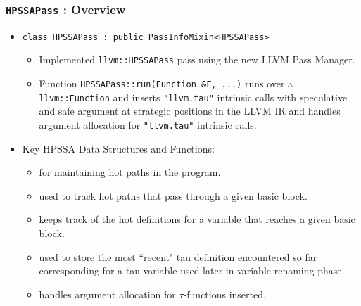 \documentclass[aspectratio=169, compress]{beamer}
\begin{document}
\begin{frame}
	\frametitle{\texttt{HPSSAPass} : Overview}
	\begin{itemize}
		\item \texttt{class HPSSAPass : public PassInfoMixin<HPSSAPass>}
		\begin{itemize}
			\footnotesize
			\item Implemented \texttt{llvm::HPSSAPass} pass using the new LLVM Pass Manager. 
			\item Function \texttt{HPSSAPass::run(Function &F, ...)}  runs over a \texttt{llvm::Function} and inserts \texttt{"llvm.tau"} intrinsic calls with speculative and safe argument at strategic positions in the LLVM IR and handles argument allocation for \texttt{"llvm.tau"} intrinsic calls. \pause
		\end{itemize}
		\item Key HPSSA Data Structures and Functions:  \pause
		\begin{itemize}
			\footnotesize
			\item {} \pause for maintaining \color{red} hot paths \color{black} in the program. \pause
			\item {} \pause used to track \color{red} hot paths \color{black} that pass through a given basic block. \pause
			\item {} \pause keeps track of the \color{red} hot \color{black} definitions for a variable that reaches a given basic block. \pause
			\item {} \pause used to store the most ``recent" tau definition encountered so far corresponding for a tau variable used later in variable renaming phase. \pause
			\item {} \pause handles argument allocation for $\tau$-functions inserted.
		\end{itemize}
	\end{itemize}
\end{frame}
\end{document}
